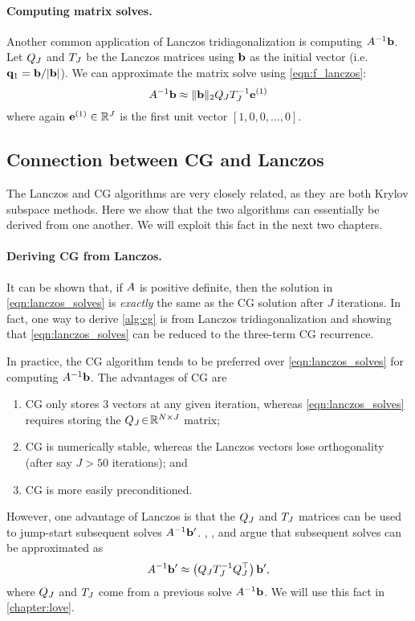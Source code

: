 \paragraph{Computing matrix solves.}
Another common application of Lanczos tridiagonalization is computing $A^{-1} \mathbf{b}$.
Let $Q_J$ and $T_J$ be the Lanczos matrices using $\mathbf{b}$ as the initial vector (i.e. $\mathbf{q}_1 = \mathbf{b} / \vert \mathbf{b} \vert$).
We can approximate the matrix solve using \cref{eqn:f_lanczos}:
%
\begin{equation}
  A^{-1} \mathbf{b} \approx \Vert \mathbf{b} \Vert_2 Q_J T_J^{-1} \mathbf{e}^{(1)}
  \label{eqn:lanczos_solves}
\end{equation}
%
where again $\mathbf{e}^{(1)} \in \mathbb{R}^J$ is the first unit vector $[1, 0, 0, \ldots, 0]$.




\subsection{Connection between CG and Lanczos}
\label{sec:cg_lanczos_connection}

The Lanczos and CG algorithms are very closely related, as they are both Krylov subspace methods.
Here we show that the two algorithms can essentially be derived from one another.
We will exploit this fact in the next two chapters.

\paragraph{Deriving CG from Lanczos.}
It can be shown that, if $A$ is positive definite, then the solution in \cref{eqn:lanczos_solves} is \emph{exactly} the same as the CG solution after $J$ iterations.
In fact, one way to derive \cref{alg:cg} is from Lanczos tridiagonalization and showing that \cref{eqn:lanczos_solves} can be reduced to the three-term CG recurrence.

In practice, the CG algorithm tends to be preferred over \cref{eqn:lanczos_solves} for computing $A^{-1} \mathbf{b}$.
The advantages of CG are
\begin{enumerate}
  \item CG only stores 3 vectors at any given iteration, whereas \cref{eqn:lanczos_solves} requires storing the $Q_J \! \in \! \mathbb{R}^{N \times J}$ matrix;
  \item CG is numerically stable, whereas the Lanczos vectors lose orthogonality (after say $J > 50$ iterations); and
  \item CG is more easily preconditioned.
\end{enumerate}
However, one advantage of Lanczos is that the $Q_J$ and $T_J$ matrices can be used to jump-start subsequent solves $A^{-1} \mathbf{b}'$.
\citet{parlett1980new}, \citet{saad1987lanczos}, and \citet{schneider2001krylov} argue that subsequent solves can be approximated as
%
\begin{equation}
  A^{-1} \mathbf{b}' \approx \left( Q_J T_J^{-1} Q_J^\top \right) \mathbf{b}',
  \label{eqn:lanczos_solve}
\end{equation}
%
where $Q_J$ and $T_J$ come from a previous solve $A^{-1} \mathbf{b}$.
We will use this fact in \cref{chapter:love}.

